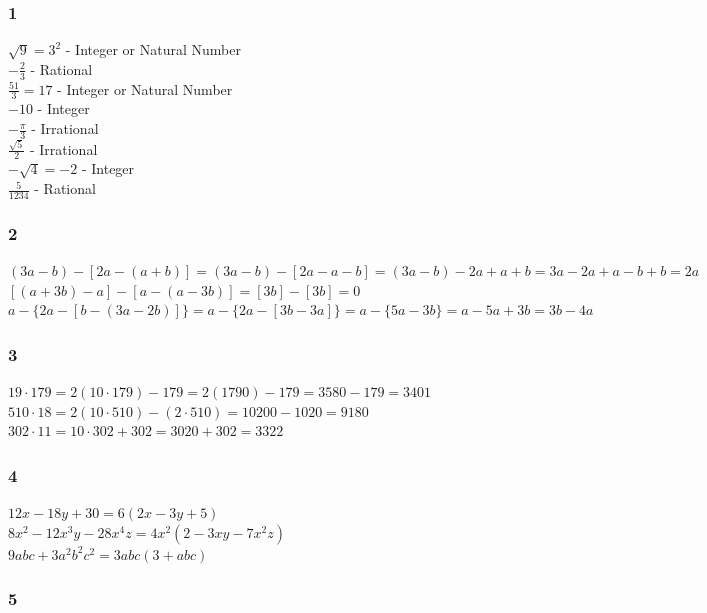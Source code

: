 \documentclass[]{report}
\begin{document}
\subsubsection{1}
$\sqrt{9} = 3^2$ - Integer or Natural Number\\
$-\frac{2}{3}$ - Rational \\
$ \frac{51}{3} = 17 $ - Integer or Natural Number \\
$ -10 $ - Integer \\
$ -\frac{\pi}{3} $ - Irrational \\
$ \frac{\sqrt{5}}{2} $ - Irrational \\
$ - \sqrt{4} = -2 $ - Integer \\
$ \frac{5}{1234} $ - Rational 

\subsubsection{2}
$ (3a - b)  - [2a - (a + b)] = (3a - b) - [2a - a - b] = (3a - b) - 2a + a + b = 3a - 2a + a - b + b = 2a $ \\


$ [(a + 3b) -a] - [a - (a - 3b)] =  [3b] -  [3b] = 0 $ \\



$ a - \{2a - [b - (3a - 2b)]\} = a  - \{2a - [3b - 3a]\} = a  - \{5a - 3b\} = a - 5a + 3b = 3b - 4a $

\subsubsection{3}
$ 19 \cdot 179 = 2(10 \cdot 179) - 179 = 2(1790) - 179 = 3580 - 179 = 3401 $ \\
$ 510 \cdot 18 = 2(10 \cdot 510) - (2 \cdot 510) = 10200 - 1020 = 9180 $ \\
$ 302 \cdot 11 = 10\cdot 302 + 302 = 3020 + 302 = 3322 $ \\

\subsubsection{4}

$ 12x - 18y + 30 = 6(2x - 3y + 5)$ \\
$ 8x^2 - 12x^3y - 28x^4z = 4x^2(2 - 3xy -7x^2z)$ \\
$ 9abc + 3a^2b^2c^2 = 3abc(3 + abc) $

\subsubsection{5}
\end{document}
